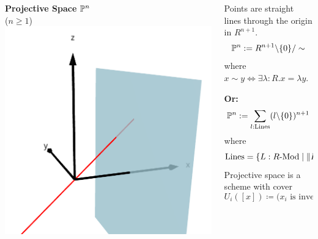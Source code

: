 \documentclass{beamer}
\begin{document}
\begin{frame}
  \begin{columns}
    \begin{column}{0.5\textwidth}
      \textbf{Projective Space} $\mathbb{P}^n$ \\
      \pause
      ($n\geq 1$)
      \vspace{4mm}
      \pause
      \includegraphics[width=\textwidth]{projective-space.png}
      \vspace{2cm}
    \end{column}
    
    \begin{column}{0.5\textwidth}
      \pause
      Points are straight lines through the origin in $R^{n+1}$.
      \[ \mathbb{P}^n:= R^{n+1}\text{\textbackslash}\{0\}/\sim \]
      where $x\sim y \Leftrightarrow \exists \lambda :R. x=\lambda y$. 

      \vspace{1em}
      \pause
      \textbf{Or:}
      \[ \mathbb{P}^n:= \sum_{l:\mathrm{Lines}}(l\text{\textbackslash}\{0\})^{n+1} \]
      where
      \[\mathrm{Lines}=\{L:R\text{-}\mathrm{Mod}\mid \|L=R^1\|\}.\]
      \pause
      Projective space is a scheme with cover
      \[ U_i([x]) \coloneq \text{($x_i$ is invertible)}. \]      
    \end{column}

  \end{columns}
\end{frame}
\end{document}
